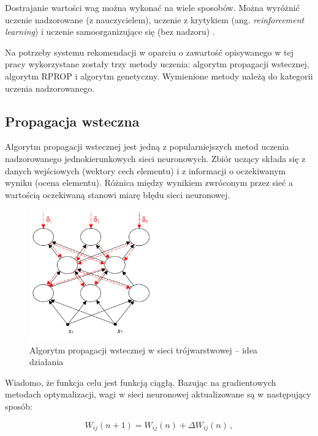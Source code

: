 \documentclass[twoside]{iisthesis}
\begin{document}
		 Dostrajanie wartości wag można wykonać na wiele sposobów. Można wyróżnić uczenie nadzorowane (z nauczycielem), uczenie z krytykiem (ang. \textit{reinforcement learning}) i uczenie samoorganizujące się (bez nadzoru) \cite{osowski1996sieci}.
		 
		 Na potrzeby systemu rekomendacji w oparciu o zawartość opisywanego w tej pracy wykorzystane zostały trzy metody uczenia: algorytm propagacji wstecznej, algorytm RPROP i algorytm genetyczny. Wymienione metody należą do kategorii uczenia nadzorowanego. 
		 
		 
		 \subsection{Propagacja wsteczna}
	 
		 Algorytm propagacji wstecznej jest jedną z popularniejszych metod uczenia nadzorowanego jednokierunkowych sieci neuronowych. Zbiór uczący składa się z danych wejściowych (wektory cech elementu) i z informacji o oczekiwanym wyniku (ocena elementu). Różnica między wynikiem zwróconym przez sieć a wartością oczekiwaną stanowi miarę błędu sieci neuronowej. 
		 
		 \begin{figure}[!ht] 
	 		 	\centering
	 		 	\includegraphics[width=0.5\textwidth]{ilustracjabackprop}
	 		 	\caption{Algorytm propagacji wstecznej w sieci trójwarstwowej -- idea działania \protect\cite{kwateralgorytmy}}
	 		 	\label{fig:ilustracjabackprop}
		 \end{figure}
		 
		 Wiadomo, że funkcja celu jest funkcją ciągłą. Bazując na gradientowych metodach optymalizacji, wagi w sieci neuronowej aktualizowane są w następujący sposób:	 
		 
 		 \begin{equation}
 		 \label{eq:weightadaptation3}
 		 W_{ij}(n+1) = W_{ij}(n) + \Delta W_{ij}(n) 
 		 \,,
 		 \end{equation}
 		 
\end{document}
